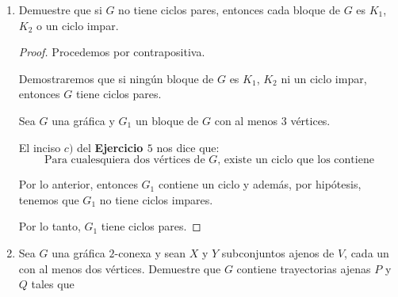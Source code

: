 \documentclass{article}
\begin{document}
\begin{enumerate}
\begin{proof}
\begin{itemize}
                        Tenemos que $u$ y $v$ están conectados por al menos dos $uv$-trayectorias ajenas por aristas $P$ y $Q$. Esto implica que si queremos desconectar a la gráfica $G$, debemos borrar dos aristas (una arista en $P$ y otra en $Q$). Entonces, $G$ sigue siendo conexa si tenemos subconjuntos $S$ en $G$ con $|S| < 2$.

                        Por lo tanto, tenemos que $G$ es 2-conexa.

                \end{itemize}
                De lo anterior, concluimos que $G$ es $2$-conexa por aristas si y s\'olo si
                cualesquiera dos v\'ertices est\'an conectados por al menos dos trayectorias
                ajenas por aristas.
            \end{proof}

        \item Demuestre que si $G$ no tiene ciclos pares, entonces cada bloque de $G$ es $K_1$, $K_2$ o un ciclo impar.

            \renewcommand\qedsymbol{QED}
            \begin{proof}
               Procedemos por contrapositiva.

               Demostraremos que si ningún bloque de $G$ es $K_{1}$, $K_{2}$ ni un ciclo impar, entonces $G$ tiene ciclos pares.

               Sea $G$ una gráfica y $G_{1}$ un bloque de $G$ con al menos $3$ vértices.

               El inciso $c)$ del \textbf{Ejercicio $5$} nos dice que:
               $$\text{Para cualesquiera dos vértices de } G \text{, existe un ciclo que los contiene}$$

               Por lo anterior, entonces $G_{1}$ contiene un ciclo y además, por hipótesis, tenemos que $G_{1}$ no tiene ciclos impares.

               Por lo tanto, $G_{1}$ tiene ciclos pares.
            \end{proof}


        \item Sea $G$ una gr\'afica $2$-conexa y sean $X$ y $Y$ subconjuntos ajenos de $V$, cada un con al menos dos v\'ertices.   Demuestre que $G$ contiene
        trayectorias ajenas $P$ y $Q$ tales que


\end{enumerate}
\end{document}
